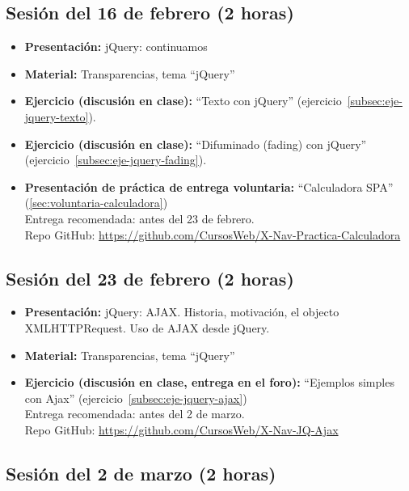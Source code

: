 \documentclass[a4paper,12pt]{report}
\begin{document}
\subsection{Sesión del 16 de febrero (2 horas)}

\begin{itemize}
\item \textbf{Presentación:} jQuery: continuamos
\item \textbf{Material:} Transparencias, tema ``jQuery''
\item \textbf{Ejercicio (discusión en clase):} ``Texto con jQuery'' (ejercicio~\ref{subsec:eje-jquery-texto}).
\item \textbf{Ejercicio (discusión en clase):} ``Difuminado (fading) con jQuery'' (ejercicio~\ref{subsec:eje-jquery-fading}).
\item \textbf{Presentación de práctica de entrega voluntaria:} ``Calculadora SPA'' (\ref{sec:voluntaria-calculadora}) \\
  Entrega recomendada: antes del 23 de febrero. \\
  Repo GitHub: \url{https://github.com/CursosWeb/X-Nav-Practica-Calculadora} \\
\end{itemize}


\subsection{Sesión del 23 de febrero (2 horas)}

\begin{itemize}
\item \textbf{Presentación:} jQuery: AJAX. Historia, motivación, el objecto XMLHTTPRequest. Uso de AJAX desde jQuery.
\item \textbf{Material:} Transparencias, tema ``jQuery''
\item \textbf{Ejercicio (discusión en clase, entrega en el foro):} ``Ejemplos simples con Ajax'' (ejercicio~\ref{subsec:eje-jquery-ajax}) \\
  Entrega recomendada: antes del 2 de marzo. \\
  Repo GitHub: \url{https://github.com/CursosWeb/X-Nav-JQ-Ajax}
\end{itemize}

\subsection{Sesión del 2 de marzo (2 horas)}
\end{document}
